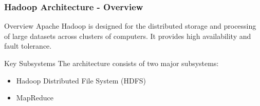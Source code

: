 \documentclass{beamer}
\begin{document}
\begin{frame}[fragile]
    \frametitle{Hadoop Architecture - Overview}
    \begin{block}{Overview}
        Apache Hadoop is designed for the distributed storage and processing of large datasets across clusters of computers.
        It provides high availability and fault tolerance.
    \end{block}
    \begin{block}{Key Subsystems}
        The architecture consists of two major subsystems:
        \begin{itemize}
            \item Hadoop Distributed File System (HDFS)
            \item MapReduce
        \end{itemize}
    \end{block}
\end{frame}
\end{document}
